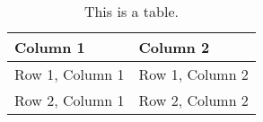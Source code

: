 \begin{table}[htbp]
  \centering
  \begin{tabular}{ll}
    \toprule
    Column 1 & Column 2 \\
    \midrule
    Row 1, Column 1 & Row 1, Column 2 \\
    Row 2, Column 1 & Row 2, Column 2 \\
    \bottomrule
  \end{tabular}
  \caption{This is a table.}
  \label{tab:table}
\end{table}